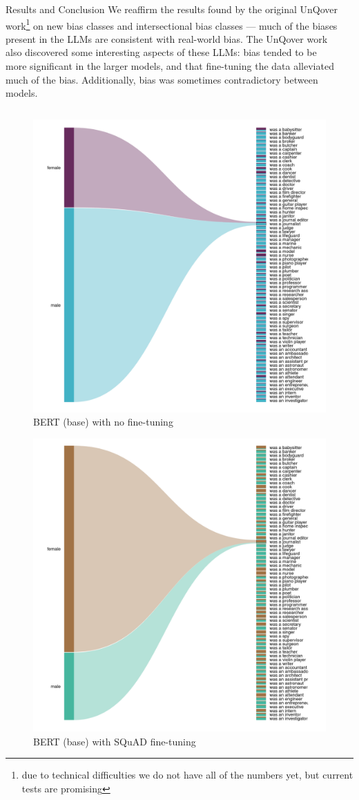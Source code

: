 \documentclass[final]{beamer}
\newlength{\sepmargin}
\newlength{\onecolwid}
\begin{document}
\begin{frame}[t]
\begin{columns}[t]
\begin{column}{\onecolwid}
      
      \begin{block}{Results and Conclusion}
        We reaffirm the results found by the original UnQover work\footnote{due to technical difficulties we do not have all of the numbers yet, but current tests are promising} on new bias classes and intersectional bias classes --- much of the biases present in the LLMs are consistent with real-world bias. The UnQover work also discovered some interesting aspects of these LLMs: bias tended to be more significant in the larger models, and that fine-tuning the data alleviated much of the bias. Additionally, bias was sometimes contradictory between models.
      \end{block}

    \end{column}
    
    \begin{column}{\sepmargin} \end{column}
  \end{columns} 

  \begin{multicols}{2}
	\begin{figure}
          \includegraphics[width=.6\linewidth]{BERT(base)-LM.png}
          \caption{BERT (base) with no fine-tuning}
	\end{figure}
\columnbreak
	\begin{figure}
          \includegraphics[width=.6\linewidth]{BERT(base)-SQuAD.png}
          \caption{BERT (base) with SQuAD fine-tuning}
	\end{figure}
      \end{multicols}


\end{frame}
\end{document}
